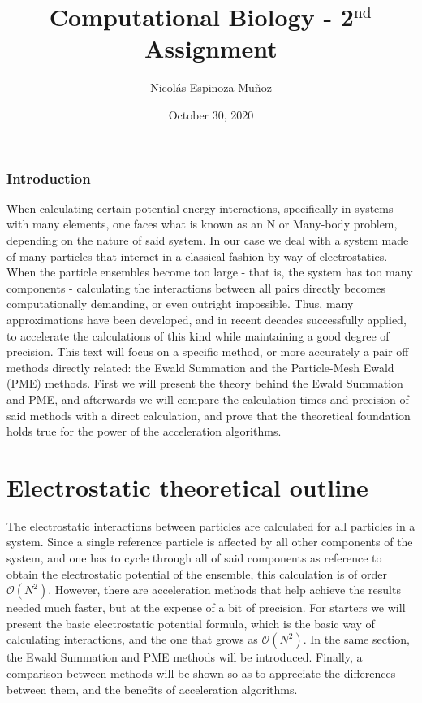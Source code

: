 \documentclass[a4paper, 12pt, notitlepage]{article}
\title{Computational Biology - 2$^\text{nd}$ Assignment}
\author{Nicolás Espinoza Muñoz}
\date{October 30, 2020}
\begin{document}
\maketitle
\subsubsection*{Introduction}
When calculating certain potential energy interactions, specifically in systems with many elements, one faces what is known as an N or Many-body problem, depending on the nature of said system. In our case we deal with a system made of many particles that interact in a classical fashion by way of electrostatics. When the particle ensembles become too large - that is, the system has too many components - calculating the interactions between all pairs directly becomes computationally demanding, or even outright impossible. Thus, many approximations have been developed, and in recent decades successfully applied, to accelerate the calculations of this kind while maintaining a good degree of precision. This text will focus on a specific method, or more accurately a pair off methods directly related: the Ewald Summation and the Particle-Mesh Ewald (PME) methods. First we will present the theory behind the Ewald Summation and PME, and afterwards we will compare the calculation times and precision of said methods with a direct calculation, and prove that the theoretical foundation holds true for the power of the acceleration algorithms.
\section*{Electrostatic theoretical outline}
The electrostatic interactions between particles are calculated for all particles in a system. Since a single reference particle is affected by all other components of the system, and one has to cycle through all of said components as reference to obtain the electrostatic potential of the ensemble, this calculation is of order $\mathcal{O}(N^2)$. However, there are acceleration methods that help achieve the results needed much faster, but at the expense of a bit of precision. For starters we will present the basic electrostatic potential formula, which is the basic way of calculating interactions, and the one that grows as $\mathcal{O}(N^2)$. In the same section, the Ewald Summation and PME methods will be introduced. Finally, a comparison between methods will be shown so as to appreciate the differences between them, and the benefits of acceleration algorithms.
\end{document}
